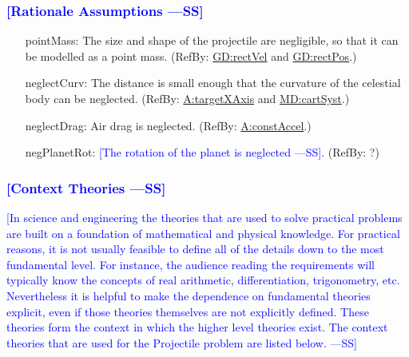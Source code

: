 \documentclass[12pt]{article}
\newcommand{\authornote}[3]{\textcolor{#1}{[#3 ---#2]}}
\newcommand{\authornote}[3]{}
\newcommand{\wss}[1]{\authornote{blue}{SS}{#1}}
\begin{document}
\subsubsection{\wss{Rationale Assumptions}}

\begin{itemize}
\item[pointMass:\phantomsection\label{pointMass}]{The size and shape of the projectile are negligible, so that it can be modelled as a point mass. (RefBy: \hyperref[GD:rectVel]{GD:rectVel} and \hyperref[GD:rectPos]{GD:rectPos}.)}
\item[neglectCurv:\phantomsection\label{neglectCurv}]{The distance is small enough that the curvature of the celestial body can be neglected. (RefBy: \hyperref[targetXAxis]{A:targetXAxis} and \hyperref[MD:cartSyst]{MD:cartSyst}.)}
\item[neglectDrag:\phantomsection\label{neglectDrag}]{Air drag is neglected. (RefBy: \hyperref[constAccel]{A:constAccel}.)}
\item[negPlanetRot:\phantomsection\label{negEarthRot}]{\wss{The rotation of the
planet is neglected}. (RefBy: ?)}

\end{itemize}

\subsubsection{\wss{Context Theories}}

\wss{In science and engineering the theories that are used to solve practical
problems are built on a foundation of mathematical and physical knowledge. For
practical reasons, it is not usually feasible to define all of the details down
to the most fundamental level. For instance, the audience reading the
requirements will typically know the concepts of real arithmetic,
differentiation, trigonometry, etc.  Nevertheless it is helpful to make the
dependence on fundamental theories explicit, even if those theories themselves
are not explicitly defined. These theories form the context in which the higher
level theories exist.  The context theories that are used for the Projectile
problem are listed below.}
\end{document}
